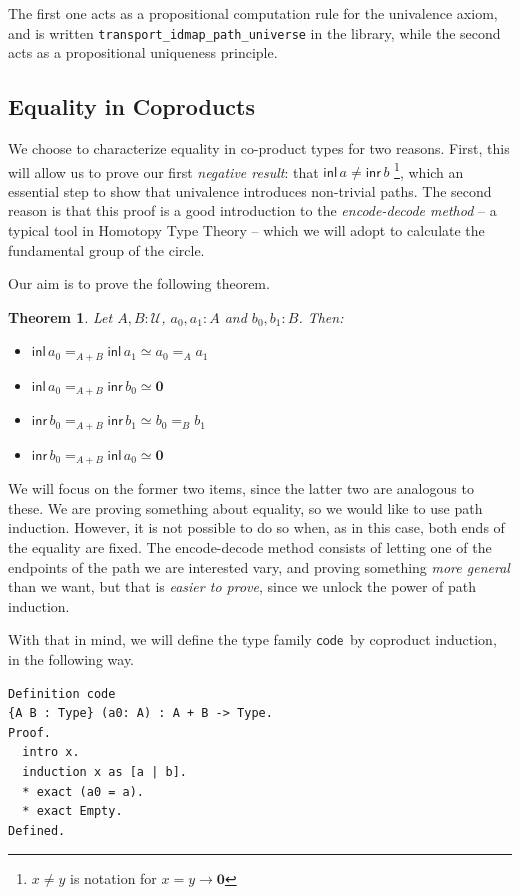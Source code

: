 \documentclass[12 pt]{amsart}
\newtheorem{theorem}[subsubsection]{Theorem}
\theoremstyle{definition}
\theoremstyle{remark}
\newcommand{\inl}{\mathsf{inl}\,}
\newcommand{\inr}{\mathsf{inr}\,}
\newcommand{\Type}{\mathcal{U}}
\newcommand{\zero}{{\mathbf{0}}}
\newcommand{\code}{{\mathsf{ code}\,}}
\begin{document}
The first one acts as a propositional computation rule for the univalence axiom, and is written \texttt{transport\_idmap\_path\_universe} in the library, while the second acts as a propositional uniqueness principle.



\subsection{Equality in Coproducts}
\label{subsec:eqcoprod}

We choose to characterize equality in co-product types for two reasons. First, this will allow us to prove our first \textit{negative result}: that $\inl a \neq \inr b$ \footnote{$x \neq y$ is notation for $x = y \to \zero$}, which an essential step to show that univalence introduces non-trivial paths. The second reason is that this proof is a good introduction to the \textit{encode-decode method} -- a typical tool in Homotopy Type Theory -- which we will adopt to calculate the fundamental group of the circle. 

Our aim is to prove the following theorem.

\begin{theorem}
Let $A, B : \Type$, $a_0, a_1 : A$ and $b_0, b_1 : B$. Then:
\begin{itemize}
\item $\inl a_0 =_{A+B} \inl a_1 \simeq a_0 =_A a_1$
\item $\inl a_0 =_{A+B} \inr b_0 \simeq \zero$
\item $\inr b_0 =_{A+B} \inr b_1 \simeq b_0 =_B b_1$
\item $\inr b_0 =_{A+B} \inl a_0 \simeq \zero$
\end{itemize}
\end{theorem}

We will focus on the former two items, since the latter two are analogous to these. We are proving something about equality, so we would like to use path induction. However, it is not possible to do so when, as in this case, both ends of the equality are fixed. The encode-decode method consists of letting one of the endpoints of the path we are interested vary, and proving something \textit{more general} than we want, but that is \textit{easier to prove}, since we unlock the power of path induction.

With that in mind, we will define the type family $\code$ by coproduct induction, in the following way.

\begin{lstlisting}
Definition code 
{A B : Type} (a0: A) : A + B -> Type.
Proof.
  intro x.
  induction x as [a | b].
  * exact (a0 = a).
  * exact Empty.
Defined.
\end{lstlisting}
\end{document}
